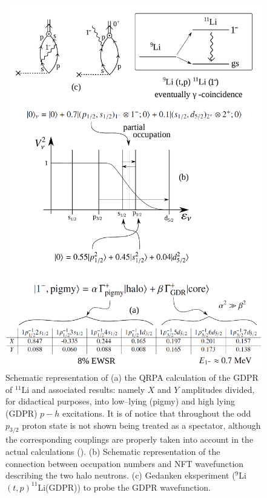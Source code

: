 \begin{subappendices}
\begin{figure}
\centerline{\includegraphics*[width=14cm,angle=0]{nutshell/figs/fig3C1}}
\caption{Schematic representation of (a) the QRPA calculation of the GDPR of $^{11}$Li and associated results: namely $X$ and $Y$ amplitudes divided, for didactical purposes, into low--lying (pigmy) and high lying (GDPR) $p-h$ excitations. It is of notice that throughout the odd $p_{3/2}$ proton state is not shown being treated as a spectator, although the corresponding couplings are properly taken  into account in the actual calculations (\cite{Barranco:01}). (b) Schematic representation of the connection between occupation numbers and NFT wavefunction describing the two halo neutrons. (c) Gedanken eksperiment ($^9$Li$(t,p)^{11}$Li(GDPR)) to probe the GDPR wavefunction. }\label{fig3C1}
\end{figure}

\end{subappendices}
